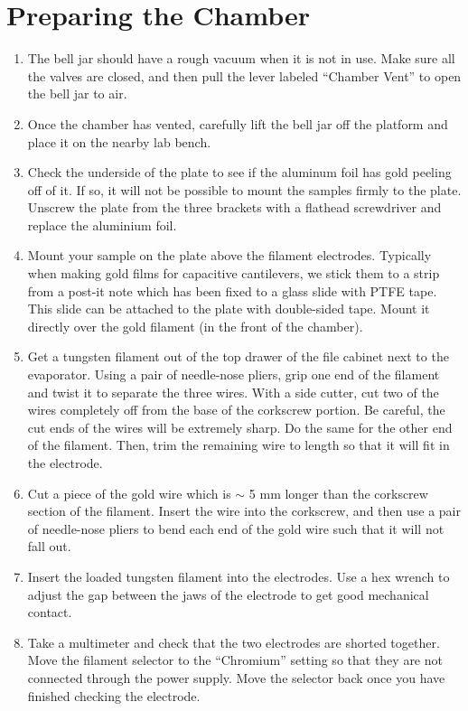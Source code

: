 \documentclass{thesis-umich}
\begin{document}
\section{Preparing the Chamber}
\label{evap:prep}
\begin{enumerate}
	\item The bell jar should have a rough vacuum when it is not in use. Make sure all the valves are closed, and then pull the lever labeled ``Chamber Vent'' to open the bell jar to air.
	\item Once the chamber has vented, carefully lift the bell jar off the platform and place it on the nearby lab bench.
	\item Check the underside of the plate to see if the aluminum foil has gold peeling off of it. If so, it will not be possible to mount the samples firmly to the plate. Unscrew the plate from the three brackets with a flathead screwdriver and replace the aluminium foil.
	\item Mount your sample on the plate above the filament electrodes. Typically when making gold films for capacitive cantilevers, we stick them to a strip from a post-it note which has been fixed to a glass slide with PTFE tape. This slide can be attached to the plate with double-sided tape. Mount it directly over the gold filament (in the front of the chamber).
	\item Get a tungsten filament out of the top drawer of the file cabinet next to the evaporator. Using a pair of needle-nose pliers, grip one end of the filament and twist it to separate the three wires. With a side cutter, cut two of the wires completely off from the base of the corkscrew portion. Be careful, the cut ends of the wires will be extremely sharp. Do the same for the other end of the filament. Then, trim the remaining wire to length so that it will fit in the electrode.
	\item Cut a piece of the gold wire which is $\sim$ 5 mm longer than the corkscrew section of the filament. Insert the wire into the corkscrew, and then use a pair of needle-nose pliers to bend each end of the gold wire such that it will not fall out. 
	\item Insert the loaded tungsten filament into the electrodes. Use a hex wrench to adjust the gap between the jaws of the electrode to get good mechanical contact.
	\item Take a multimeter and check that the two electrodes are shorted together. Move the filament selector to the ``Chromium'' setting so that they are not connected through the power supply. Move the selector back once you have finished checking the electrode.

\end{enumerate}
\end{document}
